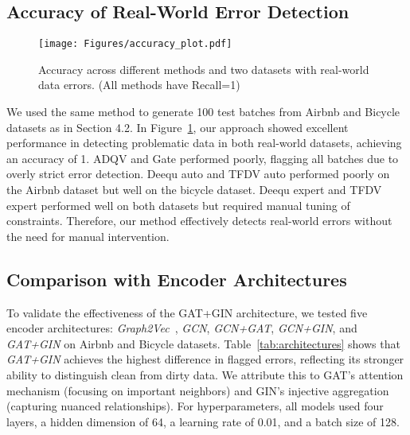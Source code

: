 \subsection{Accuracy of Real-World Error Detection}
\begin{figure}[tb]
\centering
\texttt{[image: Figures/accuracy\_plot.pdf]}
\caption{Accuracy across different methods and two datasets with real-world data errors. (All methods have Recall=1)}
\label{fig:accuracy}
\end{figure}

We used the same method to generate 100 test batches from Airbnb and Bicycle datasets as in Section 4.2. In Figure~\ref{fig:accuracy}, our approach showed excellent performance in detecting problematic data in both real-world datasets, achieving an accuracy of 1. 
ADQV and Gate performed poorly, flagging all batches due to overly strict error detection. 
Deequ auto and TFDV auto performed poorly on the Airbnb dataset but well on the bicycle dataset. Deequ expert and TFDV expert performed well on both datasets but required manual tuning of constraints. 
Therefore, our method effectively detects real-world errors without the need for manual intervention.


\subsection{Comparison with Encoder Architectures}
\label{sec:gnn_comparison}
To validate the effectiveness of the GAT+GIN architecture, 
we tested five encoder architectures: \textit{Graph2Vec}~\cite{narayanan2017graph2vec}, \textit{GCN}, \textit{GCN+GAT}, \textit{GCN+GIN}, and \textit{GAT+GIN} on Airbnb and Bicycle datasets. Table~\ref{tab:architectures} shows that \textit{GAT+GIN} achieves the highest difference in flagged errors, reflecting its stronger ability to distinguish clean from dirty data. 
We attribute this to GAT’s attention mechanism (focusing on important neighbors) and GIN’s injective aggregation (capturing nuanced relationships). 
For hyperparameters, all models used four layers, a hidden dimension of 64, a learning rate of 0.01, and a batch size of 128.



